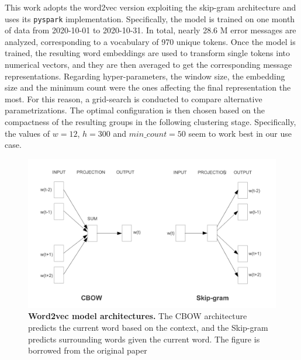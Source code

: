 This work adopts the word2vec version exploiting the skip-gram architecture and uses its \texttt{pyspark} implementation.
Specifically, the model is trained on one month of data from 2020-10-01 to 2020-10-31.
In total, nearly 28.6 M error messages are analyzed, corresponding to a vocabulary of 970 unique tokens.
Once the model is trained, the resulting word embeddings are used to transform single tokens into numerical vectors, and they are then averaged to get the corresponding message representations.
Regarding hyper-parameters, the window size, the embedding size and the minimum count were the ones affecting the final representation the most.
For this reason, a grid-search is conducted to compare alternative parametrizations.  
The optimal configuration is then chosen based on the compactness of the resulting groups in the following clustering stage.
Specifically, the values of $w=12$, $h=300$ and $min\_count=50$ seem to work best in our use case.

\begin{figure}
    \centering
    \includegraphics[width=\textwidth]{figures/410_method/word2vec.png}
    \caption{\textbf{Word2vec model architectures.} The CBOW architecture predicts the current word based on the
context, and the Skip-gram predicts surrounding words given the current word. The figure is borrowed from the original paper \protect \cite{mikolov2013word2vec}
}
    \label{fig:word2vec}
\end{figure}